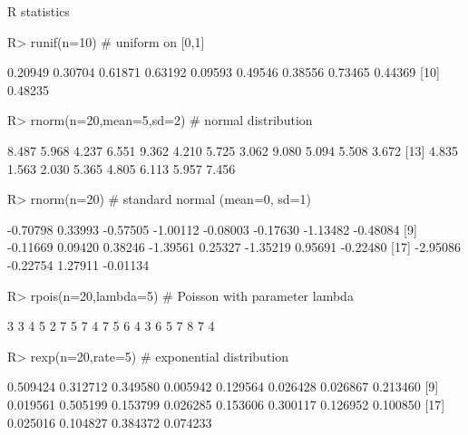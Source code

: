 \documentclass[10pt]{beamer}
\let\proglang=\textsf
\begin{document}
\begin{frame}[fragile]{\proglang{R} statistics}
\begin{Schunk}
\begin{Sinput}
R> runif(n=10) # uniform on [0,1]
\end{Sinput}
\begin{Soutput}
 [1] 0.20949 0.30704 0.61871 0.63192 0.09593 0.49546 0.38556 0.73465 0.44369
[10] 0.48235
\end{Soutput}
\begin{Sinput}
R> rnorm(n=20,mean=5,sd=2)  # normal distribution
\end{Sinput}
\begin{Soutput}
 [1] 8.487 5.968 4.237 6.551 9.362 4.210 5.725 3.062 9.080 5.094 5.508 3.672
[13] 4.835 1.563 2.030 5.365 4.805 6.113 5.957 7.456
\end{Soutput}
\begin{Sinput}
R> rnorm(n=20)   # standard normal (mean=0, sd=1)       
\end{Sinput}
\begin{Soutput}
 [1] -0.70798  0.33993 -0.57505 -1.00112 -0.08003 -0.17630 -1.13482 -0.48084
 [9] -0.11669  0.09420  0.38246 -1.39561  0.25327 -1.35219  0.95691 -0.22480
[17] -2.95086 -0.22754  1.27911 -0.01134
\end{Soutput}
\begin{Sinput}
R> rpois(n=20,lambda=5) # Poisson with parameter lambda
\end{Sinput}
\begin{Soutput}
 [1] 3 3 4 5 2 7 5 7 4 7 5 6 4 3 6 5 7 8 7 4
\end{Soutput}
\begin{Sinput}
R> rexp(n=20,rate=5) # exponential distribution
\end{Sinput}
\begin{Soutput}
 [1] 0.509424 0.312712 0.349580 0.005942 0.129564 0.026428 0.026867 0.213460
 [9] 0.019561 0.505199 0.153799 0.026285 0.153606 0.300117 0.126952 0.100850
[17] 0.025016 0.104827 0.384372 0.074233
\end{Soutput}
\end{Schunk}
\end{frame}
%
\end{document}
